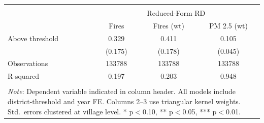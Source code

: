 \begin{tabular}{l*{3}{c}} 
\\[-1.8ex]\hline \hline \\[-1.8ex] 
& \multicolumn{3}{c}{Reduced-Form RD}
 \\ \midrule
                    &\multicolumn{1}{c}{Fires}&\multicolumn{1}{c}{Fires (wt)}&\multicolumn{1}{c}{PM 2.5 (wt)}\\
\midrule
Above threshold     &       0.329\sym{*}  &       0.411\sym{**} &       0.105\sym{**} \\
                    &     (0.175)         &     (0.178)         &     (0.045)         \\
\midrule
Observations        &      133788         &      133788         &      133788         \\
R-squared           &       0.197         &       0.203         &       0.948         \\
\hline \hline \\[-1.8ex] 
\multicolumn{4}{p{\linewidth}}{\small 
\noindent \textit{Note}: Dependent 
variable indicated in column header. 
All models include district-threshold 
and year FE. Columns 2--3 use 
triangular kernel weights. Std.\ errors 
clustered at village level. 
* p$<$0.10, ** p$<$0.05, 
*** p$<$0.01.} 
\end{tabular}
